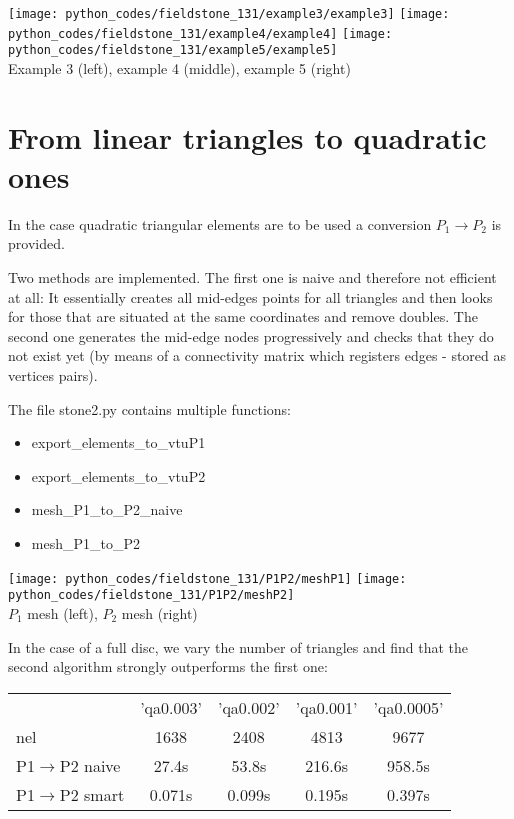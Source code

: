 \begin{center}
\texttt{[image: python\_codes/fieldstone\_131/example3/example3]}
\texttt{[image: python\_codes/fieldstone\_131/example4/example4]}
\texttt{[image: python\_codes/fieldstone\_131/example5/example5]}\\
{\captionfont Example 3 (left), example 4 (middle), example 5 (right)}
\end{center}

\section*{From linear triangles to quadratic ones}

In the case quadratic triangular elements are to be used a conversion $P_1 \rightarrow P_2$
is provided.

Two methods are implemented. The first one is naive and therefore not efficient at all:
It essentially creates all mid-edges points for all triangles and then looks for those 
that are situated at the same coordinates and remove doubles. 
The second one generates the mid-edge nodes progressively and checks that they do not 
exist yet (by means of a connectivity matrix which registers edges - 
stored as vertices pairs).


The file {\pythonfile stone2.py} contains multiple functions:
\begin{itemize}
\item {\pythonfile export\_elements\_to\_vtuP1}
\item {\pythonfile export\_elements\_to\_vtuP2}
\item {\pythonfile mesh\_P1\_to\_P2\_naive}
\item {\pythonfile mesh\_P1\_to\_P2}
\end{itemize}

\begin{center}
\texttt{[image: python\_codes/fieldstone\_131/P1P2/meshP1]}
\texttt{[image: python\_codes/fieldstone\_131/P1P2/meshP2]}\\
{\captionfont $P_1$ mesh (left), $P_2$ mesh (right)}
\end{center}


In the case of a full disc, we vary the number of triangles and find that 
the second algorithm strongly outperforms the first one:
 
\begin{center}
\begin{tabular}{|l|c|c|c|c|}
\hline
                       & 'qa0.003' & 'qa0.002' & 'qa0.001' & 'qa0.0005' \\
nel                    & 1638      & 2408      & 4813 &  9677\\
\hline
P1$\rightarrow$P2 naive& 27.4s      & 53.8s     & 216.6s & 958.5s\\
P1$\rightarrow$P2 smart& 0.071s     & 0.099s    & 0.195s & 0.397s\\
\hline
\end{tabular}
\end{center}




